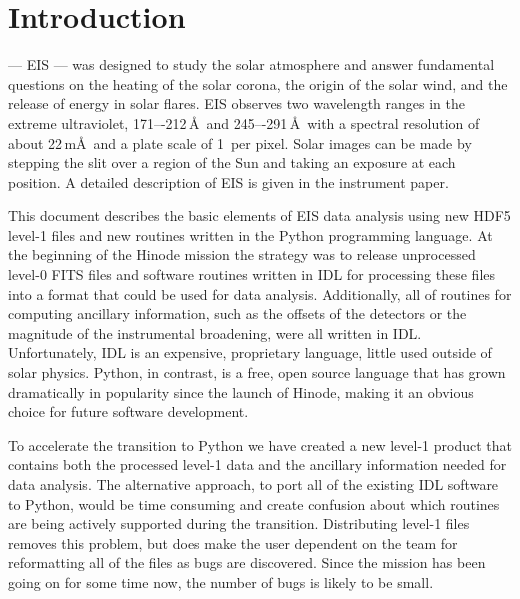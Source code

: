 
\chapter{Introduction}

 --- EIS --- was designed to study the solar atmosphere and answer
fundamental questions on the heating of the solar corona, the origin of the solar wind, and the
release of energy in solar flares. EIS observes two wavelength ranges in the extreme ultraviolet,
171–-212\,\AA\ and 245–-291\,\AA\ with a spectral resolution of about 22\,m\AA\ and a plate scale
of 1\arcsec\ per pixel. Solar images can be made by stepping the slit over a region of the Sun and
taking an exposure at each position. A detailed description of EIS is given in the instrument
paper\cite{Culhane:2007}.

This document describes the basic elements of EIS data analysis using new HDF5 level-1 files and
new routines written in the Python programming language. At the beginning of the Hinode mission the
strategy was to release unprocessed level-0 FITS files and software routines written in IDL for
processing these files into a format that could be used for data analysis. Additionally, all of
routines for computing ancillary information, such as the offsets of the detectors or the magnitude
of the instrumental broadening, were all written in IDL. Unfortunately, IDL is an expensive,
proprietary language, little used outside of solar physics. Python, in contrast, is a free, open
source language that has grown dramatically in popularity since the launch of Hinode, making it an
obvious choice for future software development.

To accelerate the transition to Python we have created a new level-1 product that contains both the
processed level-1 data and the ancillary information needed for data analysis. The alternative
approach, to port all of the existing IDL software to Python, would be time consuming and create
confusion about which routines are being actively supported during the transition. Distributing
level-1 files removes this problem, but does make the user dependent on the team for reformatting
all of the files as bugs are discovered. Since the mission has been going on for some time now, the
number of bugs is likely to be small.


